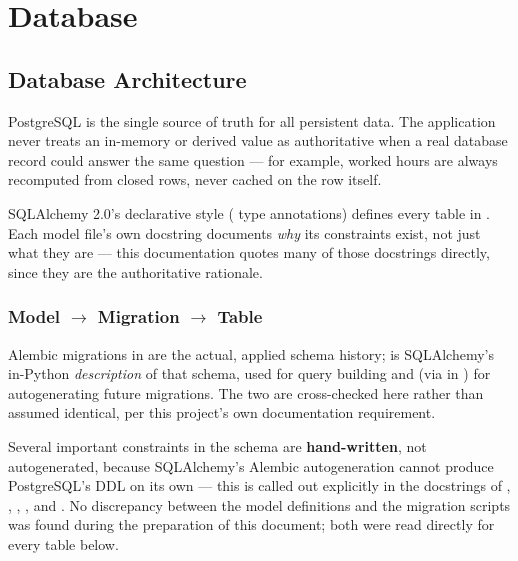 \chapter{Database}

\section{Database Architecture}

PostgreSQL is the single source of truth for all persistent data. The
application never treats an in-memory or derived value as authoritative
when a real database record could answer the same question --- for
example, worked hours are always recomputed from closed
 rows, never cached on the 
row itself.

SQLAlchemy 2.0's declarative style ( type
annotations) defines every table in . Each model
file's own docstring documents \emph{why} its constraints exist, not
just what they are --- this documentation quotes many of those
docstrings directly, since they are the authoritative rationale.

\subsection*{Model $\rightarrow$ Migration $\rightarrow$ Table}

Alembic migrations in  are the actual,
applied schema history;  is SQLAlchemy's
in-Python \emph{description} of that schema, used for query building
and (via  in ) for
autogenerating future migrations. The two are cross-checked here rather
than assumed identical, per this project's own documentation
requirement.

Several important constraints in the schema are \textbf{hand-written},
not autogenerated, because SQLAlchemy's Alembic autogeneration cannot
produce PostgreSQL's  DDL on its own ---
this is called out explicitly in the docstrings of
,
,
,
,
and .
No discrepancy between the model definitions and the migration scripts
was found during the preparation of this document; both were read
directly for every table below.

